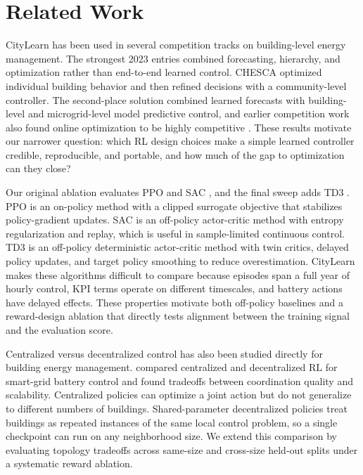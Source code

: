 \documentclass{article}
\begin{document}
\section{Related Work}\label{sec:related}

CityLearn \citep{vazquez2020citylearn, citylearnrepo} has been used in several competition tracks on building-level energy management. The strongest 2023 entries combined forecasting, hierarchy, and optimization rather than end-to-end learned control. CHESCA \citep{pinto2024citylearn} optimized individual building behavior and then refined decisions with a community-level controller. The second-place solution \citep{zheng2025optimizing} combined learned forecasts with building-level and microgrid-level model predictive control, and earlier competition work also found online optimization to be highly competitive \citep{khattar2023winning}. These results motivate our narrower question: which RL design choices make a simple learned controller credible, reproducible, and portable, and how much of the gap to optimization can they close?

Our original ablation evaluates PPO \citep{schulman2017proximal} and SAC \citep{haarnoja2018soft}, and the final sweep adds TD3 \citep{fujimoto2018addressing}. PPO is an on-policy method with a clipped surrogate objective that stabilizes policy-gradient updates. SAC is an off-policy actor-critic method with entropy regularization and replay, which is useful in sample-limited continuous control. TD3 is an off-policy deterministic actor-critic method with twin critics, delayed policy updates, and target policy smoothing to reduce overestimation. CityLearn makes these algorithms difficult to compare because episodes span a full year of hourly control, KPI terms operate on different timescales, and battery actions have delayed effects. These properties motivate both off-policy baselines and a reward-design ablation that directly tests alignment between the training signal and the evaluation score.

Centralized versus decentralized control has also been studied directly for building energy management. \citet{kathirgamanathan2021centralised} compared centralized and decentralized RL for smart-grid battery control and found tradeoffs between coordination quality and scalability. Centralized policies can optimize a joint action but do not generalize to different numbers of buildings. Shared-parameter decentralized policies treat buildings as repeated instances of the same local control problem, so a single checkpoint can run on any neighborhood size. We extend this comparison by evaluating topology tradeoffs across same-size and cross-size held-out splits under a systematic reward ablation.
\end{document}

